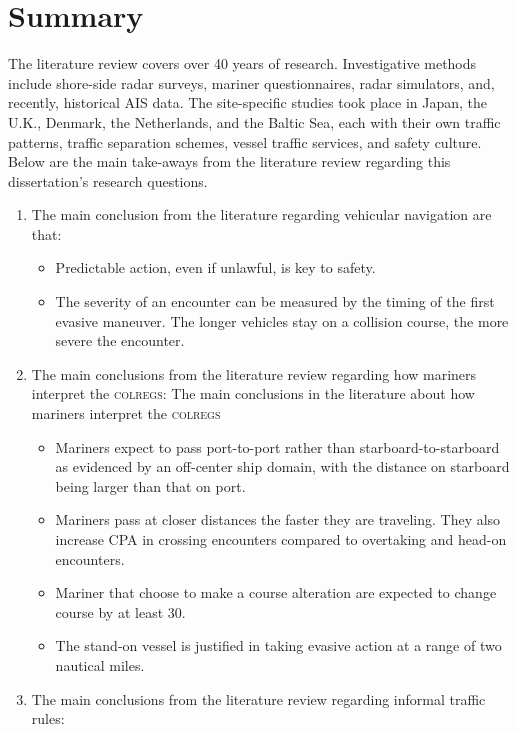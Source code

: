 \documentclass[twoside,symmetric,notoc]{tufte-book}
\begin{document}
\section{Summary}
\par{%
The literature review covers over 40 years of research. Investigative methods include shore-side radar surveys, mariner questionnaires, radar simulators, and, recently, historical AIS data. The site-specific studies took place in Japan, the U.K., Denmark, the Netherlands, and the Baltic Sea, each with their own traffic patterns, traffic separation schemes, vessel traffic services, and safety culture. Below are the main take-aways from the literature review regarding this dissertation's research questions.
\newpage
\begin{enumerate}
    \item The main conclusion from the literature regarding vehicular navigation are that:
        \begin{itemize}
            \item Predictable action, even if unlawful, is key to safety.
            \item The severity of an encounter can be measured by the timing of the first evasive maneuver. The longer vehicles stay on a collision course, the more severe the encounter.
        \end{itemize}
    \item The main conclusions from the literature review regarding how mariners interpret the \textsc{colregs}:
The main conclusions in the literature about how mariners interpret the \textsc{colregs}
    \begin{itemize}
        \item Mariners expect to pass port-to-port rather than starboard-to-starboard as evidenced by an off-center ship domain, with the distance on starboard being larger than that on port.
        \item Mariners pass at closer distances the faster they are traveling. They also increase CPA in crossing encounters compared to overtaking and head-on encounters.
        \item Mariner that choose to make a course alteration are expected to change course by at least 30\textdegree.
        \item The stand-on vessel is justified in taking evasive action at a range of two nautical miles.
    \end{itemize}
    \item The main conclusions from the literature review regarding informal traffic rules:

\end{enumerate}}
\end{document}
